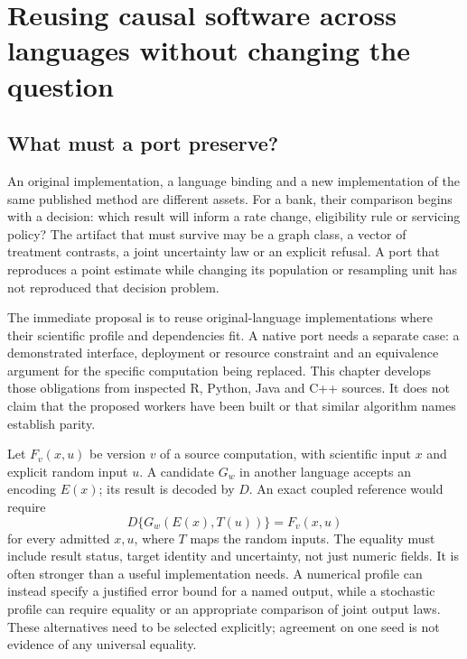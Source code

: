 \chapter{Reusing causal software across languages without changing the question}
\label{exec17:s9}

\section{What must a port preserve?}

An original implementation, a language binding and a new implementation of the
same published method are different assets. For a bank, their comparison begins
with a decision: which result will inform a rate change, eligibility rule or
servicing policy? The artifact that must survive may be a graph class, a vector
of treatment contrasts, a joint uncertainty law or an explicit refusal. A port
that reproduces a point estimate while changing its population or resampling
unit has not reproduced that decision problem.

The immediate proposal is to reuse original-language implementations where
their scientific profile and dependencies fit. A native port needs a separate
case: a demonstrated interface, deployment or resource constraint and an
equivalence argument for the specific computation being replaced. This chapter
develops those obligations from inspected R, Python, Java and C++ sources. It
does not claim that the proposed workers have been built or that similar
algorithm names establish parity.

Let $F_v(x,u)$ be version $v$ of a source computation, with scientific input
$x$ and explicit random input $u$. A candidate $G_w$ in another language accepts
an encoding $E(x)$; its result is decoded by $D$. An exact coupled reference
would require
\begin{equation}
 D\{G_w(E(x),T(u))\}=F_v(x,u)
 \label{exec17:s9-pathwise}
\end{equation}
for every admitted $x,u$, where $T$ maps the random inputs. The equality must
include result status, target identity and uncertainty, not just numeric fields.
It is often stronger than a useful implementation needs. A numerical profile
can instead specify a justified error bound for a named output, while a
stochastic profile can require equality or an appropriate comparison of joint
output laws. These alternatives need to be selected explicitly; agreement on
one seed is not evidence of any universal equality.

